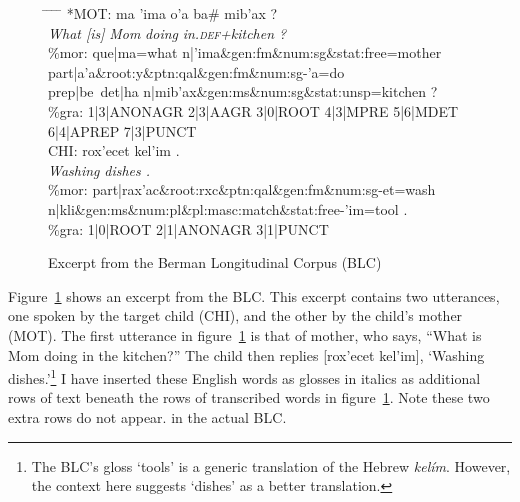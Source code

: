 \begin{figure}[t]
\begin{mdframed}
\begin{tabbing}
\hspace{0.6in} \= \hspace{0.6in} \=  \hspace{0.5in} \= \hspace{0.6in} \= \hspace{3.4in} \kill
\textsf{*MOT:} \> \textsf{ma} \> \textsf{\a'{i}ma} \> \textsf{o\a'{a}} \>  \textsf{ba\# mib\a'{a}x ?} \\
\> \textit{What [is]} \> \textit{Mom} \> \textit{doing} \> \textit{in.\textsc{def}+kitchen ?} \\[6pt]
\textsf{\%mor:} \> \textsf{que|ma=what n|\a'{i}ma\&gen:fm\&num:sg\&stat:free=mother} \\
 \> \textsf{part|a\a'{a}\&root:y\&ptn:qal\&gen:fm\&num:sg-\a'{a}=do} \\
   \> \textsf{prep|be~det|ha n|mib\a'{a}x\&gen:ms\&num:sg\&stat:unsp=kitchen ?}\\[6pt]
\textsf{\%gra:} \>	\textsf{1|3|ANONAGR 2|3|AAGR 3|0|ROOT 4|3|MPRE 5|6|MDET 6|4|APREP 7|3|PUNCT}\\[6pt]
\textsf{CHI:} \> \textsf{rox\a'{e}cet} \> \textsf{kel\a'{i}m .}\\
		\> \textit{Washing} \> \textit{dishes .}  \\[6pt]
\textsf{\%mor:} \> \textsf{part|rax\a'{a}c\&root:rxc\&ptn:qal\&gen:fm\&num:sg-et=wash} \\
    \>  \textsf{n|kli}\&\textsf{gen:ms\&num:pl\&pl:masc:match\&stat:free-\a'{i}m=tool .} \\[6pt]
\textsf{\%gra:} \> \textsf{1|0|ROOT 2|1|ANONAGR 3|1|PUNCT}
\end{tabbing}
\caption{Excerpt from the Berman Longitudinal Corpus (BLC)}
\label{fig:excerpt}
\end{mdframed}
\end{figure}
Figure~\ref{fig:excerpt} shows an excerpt from the \ac{BLC}. 
This excerpt contains two utterances, one spoken by the 
target child (CHI), and the other by the child's mother (MOT).
The first utterance in figure~\ref{fig:excerpt} is that of mother,
who says, ``What is Mom doing in the kitchen?'' The child
then replies \textsf{[rox\a'{e}cet kel\a'{i}m]}, `Washing dishes.'\footnote{The BLC's gloss `tools' is a generic translation of the Hebrew \textit{kel\'{i}m}. However, the context here suggests `dishes'
as a better translation.}
I have inserted these English words as glosses in italics as additional 
rows of text beneath the rows of transcribed words in figure~\ref{fig:excerpt}. 
Note these two extra rows do not appear. 
in the actual \ac{BLC}.

